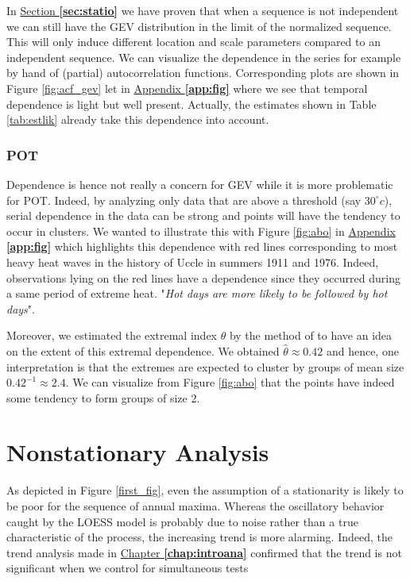In \hyperref[sec:statio]{Section \textbf{\ref{sec:statio}}} we have proven that when a sequence is not independent we can still have the GEV
distribution in the limit of the normalized sequence. This will only induce different location and scale
parameters compared to an independent sequence.
We can visualize the dependence in the series for example by hand of (partial) autocorrelation functions. Corresponding plots are shown in Figure \ref{fig:acf_gev} let in \hyperref[app:fig]{Appendix \textbf{\ref{app:fig}}} where we see that temporal dependence is light but well present. 
Actually, the estimates shown in Table \ref{tab:estlik} already take this dependence into account. 

\subsubsection*{POT}

 Dependence is hence not really a concern for GEV while it is more problematic for POT. Indeed, by analyzing only data that are above a threshold (say $30^{\circ}c$), serial dependence in the data can be strong and points will have the tendency to occur in clusters. We wanted to illustrate this with Figure \ref{fig:abo} in \hyperref[app:fig]{Appendix \textbf{\ref{app:fig}}} which highlights this dependence with red lines corresponding to most heavy heat waves in the history of Uccle in summers 1911 and 1976. Indeed, observations lying on the red lines have a dependence since they occurred during a same period of extreme heat. "\emph{Hot days are more likely to be followed by hot days}".
 
Moreover, we estimated the extremal index $\theta$ by the method of \citet{ferro_inference_2003} to have an idea on the extent of this extremal dependence. We obtained $\hat{\theta}\approx 0.42$ and hence, one interpretation is that the extremes are expected to cluster by groups of mean size $0.42^{-1}\approx 2.4$. We can visualize from Figure \ref{fig:abo} that the points have indeed some tendency to form groups of size 2.  



\section{Nonstationary Analysis}


As depicted in Figure \ref{first_fig}, even the assumption of a stationarity is likely to be poor for the sequence of annual maxima. 
Whereas the oscillatory behavior caught by the LOESS model is probably due to noise rather than a true characteristic of the process, the increasing trend is more alarming. Indeed, the trend analysis made in \hyperref[chap:introana]{Chapter \textbf{\ref{chap:introana}}} confirmed that the trend is not significant when we control for simultaneous tests


